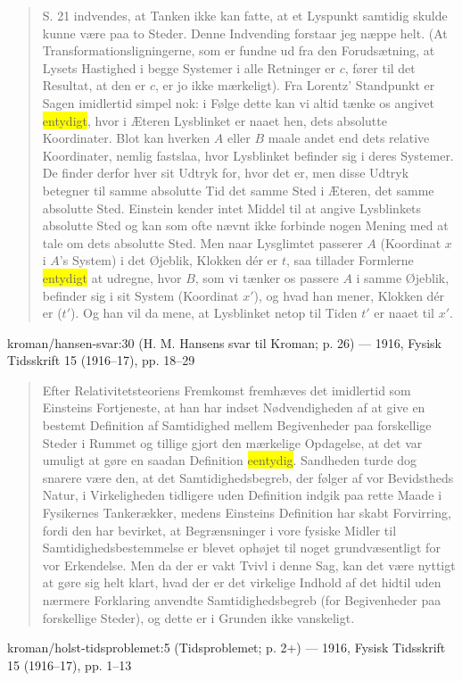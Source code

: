 \documentclass[11pt]{article}
\newcommand{\dcite}[1]{{\nopagebreak\raggedleft\small #1\par}\medskip}
\newcommand{\tlg}[1]{{\setlength{\fboxsep}{0.8pt}\colorbox{yellow}{#1}}}
\begin{document}
\begin{quote}
S. 21 indvendes, at Tanken ikke kan fatte, at et Lyspunkt samtidig
skulde kunne være paa to Steder. Denne Indvending forstaar jeg næppe
helt. (At Transformationsligningerne, som er fundne ud fra den
Forudsætning, at Lysets Hastighed i begge Systemer i alle Retninger er
$c$, fører til det Resultat, at den er $c$, er jo ikke mærkeligt). Fra
Lorentz' Standpunkt er Sagen imidlertid simpel nok: i Følge dette kan
vi altid tænke os angivet \tlg{entydigt}, hvor i Æteren Lysblinket er naaet
hen, dets absolutte Koordinater. Blot kan hverken $A$ eller $B$ maale
andet end dets relative Koordinater, nemlig fastslaa, hvor Lysblinket
befinder sig i deres Systemer. De finder derfor hver sit Udtryk for,
hvor det er, men disse Udtryk betegner til samme absolutte Tid det
samme Sted i Æteren, det samme absolutte Sted. Einstein kender intet
Middel til at angive Lysblinkets absolutte Sted og kan som ofte nævnt
ikke forbinde nogen Mening med at tale om dets absolutte Sted. Men naar
Lysglimtet passerer $A$ (Koordinat $x$ i $A$'s System) i det Øjeblik,
Klokken dér er $t$, saa tillader Formlerne \tlg{entydigt} at udregne, hvor
$B$, som vi tænker os passere $A$ i samme Øjeblik, befinder sig i sit
System (Koordinat $x'$), og hvad han mener, Klokken dér er ($t'$). Og
han vil da mene, at Lysblinket netop til Tiden $t'$ er naaet til $x'$.
\end{quote}
\dcite{kroman/hansen-svar:30  (H. M. Hansens svar til Kroman; p. 26) — 1916, Fysisk Tidsskrift 15 (1916–17), pp. 18–29}

\begin{quote}
Efter Relativitetsteoriens Fremkomst fremhæves det imidlertid som Einsteins
Fortjeneste, at han har indset Nødvendigheden af at give en bestemt Definition
af Samtidighed mellem Begivenheder paa forskellige Steder i Rummet og tillige
gjort den mærkelige Opdagelse, at det var umuligt at gøre en saadan Definition
\tlg{eentydig}. Sandheden turde dog snarere være den, at det Samtidighedsbegreb, der
følger af vor Bevidstheds Natur, i Virkeligheden tidligere uden Definition
indgik paa rette Maade i Fysikernes Tankerækker, medens Einsteins Definition
har skabt Forvirring, fordi den har bevirket, at Begrænsninger i vore fysiske
Midler til Samtidighedsbestemmelse er blevet ophøjet til noget grundvæsentligt
for vor Erkendelse. Men da der er vakt Tvivl i denne Sag, kan det være nyttigt
at gøre sig helt klart, hvad der er det virkelige Indhold af det hidtil uden
nærmere Forklaring anvendte Samtidighedsbegreb (for Begivenheder paa
forskellige Steder), og dette er i Grunden ikke vanskeligt.
\end{quote}
\dcite{kroman/holst-tidsproblemet:5  (Tidsproblemet; p. 2+) — 1916, Fysisk Tidsskrift 15 (1916–17), pp. 1–13}
\end{document}
